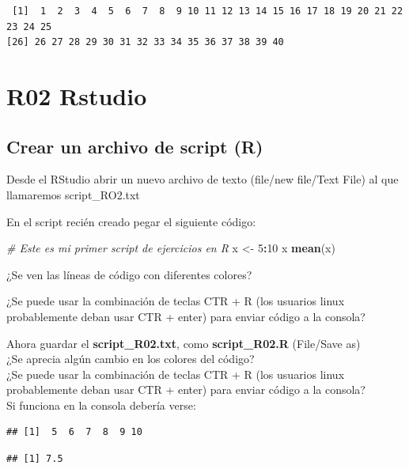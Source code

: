 \documentclass[]{book}
\newenvironment{Shaded}{\begin{snugshade}}{\end{snugshade}}
\newcommand{\CommentTok}[1]{\textcolor[rgb]{0.56,0.35,0.01}{\textit{#1}}}
\newcommand{\DecValTok}[1]{\textcolor[rgb]{0.00,0.00,0.81}{#1}}
\newcommand{\KeywordTok}[1]{\textcolor[rgb]{0.13,0.29,0.53}{\textbf{#1}}}
\newcommand{\NormalTok}[1]{#1}
\newcommand{\OperatorTok}[1]{\textcolor[rgb]{0.81,0.36,0.00}{\textbf{#1}}}
\newcommand{\StringTok}[1]{\textcolor[rgb]{0.31,0.60,0.02}{#1}}
\begin{document}
\begin{verbatim}
 [1]  1  2  3  4  5  6  7  8  9 10 11 12 13 14 15 16 17 18 19 20 21 22 23 24 25
[26] 26 27 28 29 30 31 32 33 34 35 36 37 38 39 40
\end{verbatim}

\hypertarget{r02-rstudio}{%
\chapter*{R02 Rstudio}\label{r02-rstudio}}

\hypertarget{crear-un-archivo-de-script-r}{%
\section{Crear un archivo de script (R)}\label{crear-un-archivo-de-script-r}}

Desde el RStudio abrir un nuevo archivo de texto (file/new file/Text File) al que llamaremos script\_RO2.{txt}

En el script recién creado pegar el siguiente código:

\begin{Shaded}
\begin{Highlighting}[]
\CommentTok{# Este es mi primer script de ejercicios en R}
\NormalTok{x <-}\StringTok{ }\DecValTok{5}\OperatorTok{:}\DecValTok{10}
\NormalTok{x}
\KeywordTok{mean}\NormalTok{(x)}
\end{Highlighting}
\end{Shaded}

¿Se ven las líneas de código con diferentes colores?

¿Se puede usar la combinación de teclas CTR + R (los usuarios linux probablemente deban usar CTR + enter) para enviar código a la consola?

Ahora guardar el \textbf{script\_R02.{txt}}, como \textbf{script\_R02.{R}} (File/Save as)\\
¿Se aprecia algún cambio en los colores del código?\\
¿Se puede usar la combinación de teclas CTR + R (los usuarios linux probablemente deban usar CTR + enter) para enviar código a la consola?\\
Si funciona en la consola debería verse:

\begin{verbatim}
## [1]  5  6  7  8  9 10
\end{verbatim}

\begin{verbatim}
## [1] 7.5
\end{verbatim}
\end{document}
